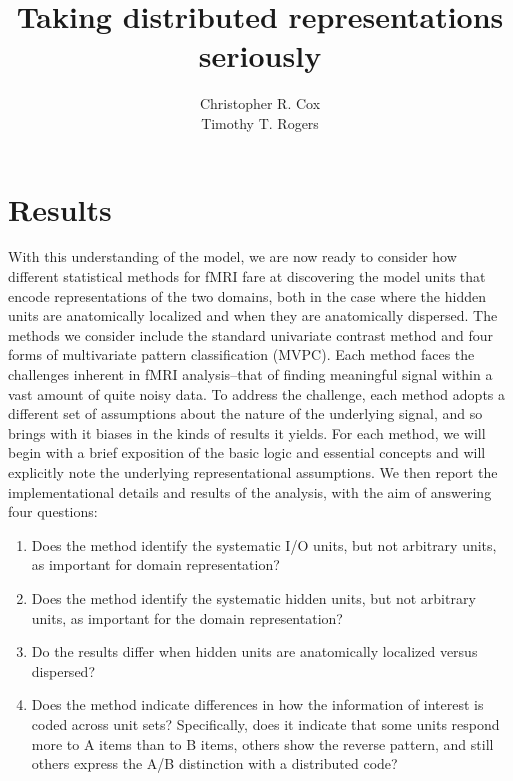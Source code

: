 \documentclass[12pt,man,draftfirst]{apa6}
\title{Taking distributed representations seriously}
\author{Christopher R. Cox\\Timothy T. Rogers}
\affiliation{University of Wisconsin, Madison}
\begin{document}
\maketitle







\section{Results}

With this understanding of the model, we are now ready to consider how different statistical methods for fMRI fare at discovering the model units that encode representations of the two domains, both in the case where the hidden units are anatomically localized and when they are anatomically dispersed. The methods we consider include the standard univariate contrast method and four forms of multivariate pattern classification (MVPC). Each method faces the challenges inherent in fMRI analysis--that of finding meaningful signal within a vast amount of quite noisy data. To address the challenge, each method adopts a different set of assumptions about the nature of the underlying signal, and so brings with it biases in the kinds of results it yields. For each method, we will begin with a brief exposition of the basic logic and essential concepts and will explicitly note the underlying representational assumptions. We then report the implementational details and results of the analysis, with the aim of answering four questions:

\begin{enumerate}
\item Does the method identify the systematic I/O units, but not arbitrary units, as important for domain representation?
\item Does the method identify the systematic hidden units, but not arbitrary units, as important for the domain representation?
\item Do the results differ when hidden units are anatomically localized versus dispersed?
\item Does the method indicate differences in how the information of interest is coded across unit sets? Specifically, does it indicate that some units respond more to A items than to B items, others show the reverse pattern, and still others express the A/B distinction with a distributed code? 
\end{enumerate}

















\end{document}
